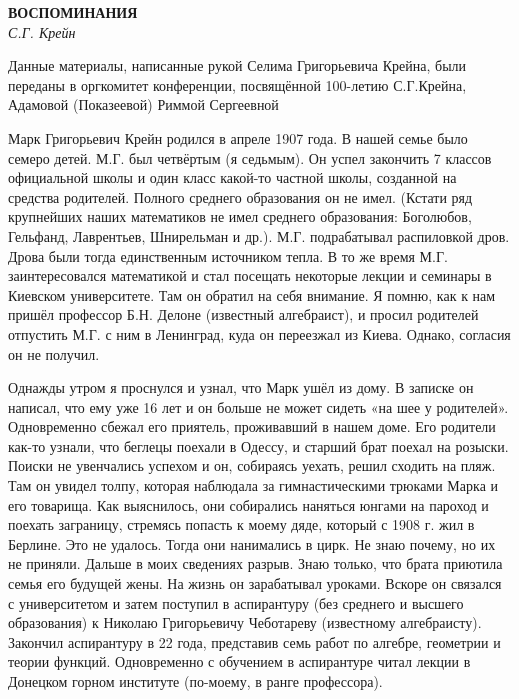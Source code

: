 \begin{center}{ \bf  ВОСПОМИНАНИЯ}\\
{\it С.Г. Крейн} \\
\end{center}
\begin{flushright}
Данные материалы,
написанные рукой Селима Григорьевича Крейна,
были переданы в оргкомитет конференции,
посвящённой 100-летию С.Г.Крейна,
 Адамовой (Показеевой) Риммой  Сергеевной
\end{flushright}

Марк Григорьевич Крейн родился в апреле 1907 года. В нашей семье было семеро детей. М.Г. был четвёртым (я седьмым). Он успел закончить 7 классов официальной школы и один класс какой-то частной школы, созданной на средства родителей. Полного среднего образования он не имел. (Кстати ряд крупнейших наших математиков не имел среднего образования: Боголюбов, Гельфанд, Лаврентьев, Шнирельман и др.). М.Г. подрабатывал распиловкой дров. Дрова были тогда единственным источником тепла. В то же время М.Г. заинтересовался математикой и стал посещать некоторые лекции и семинары в Киевском университете. Там он обратил на себя внимание. Я помню, как к нам пришёл профессор Б.Н. Делоне (известный алгебраист), и просил родителей отпустить М.Г. с ним в Ленинград, куда он переезжал из Киева. Однако, согласия он не получил.

Однажды утром я проснулся и узнал, что Марк ушёл из дому. В записке он написал, что ему уже 16 лет и он больше не может сидеть «на шее у родителей». Одновременно сбежал его приятель, проживавший в нашем доме. Его родители как-то узнали, что беглецы поехали в Одессу, и старший брат поехал на розыски. Поиски не увенчались успехом и он, собираясь уехать, решил сходить на пляж. Там он увидел толпу, которая наблюдала за гимнастическими трюками Марка и его товарища. Как выяснилось, они собирались наняться юнгами на пароход и поехать заграницу, стремясь попасть к моему дяде, который с 1908 г. жил в Берлине. Это не удалось. Тогда они нанимались в цирк. Не знаю почему, но их не приняли. Дальше в моих сведениях разрыв. Знаю только, что брата приютила семья его будущей жены. На жизнь он зарабатывал уроками. Вскоре он связался с университетом и затем поступил в аспирантуру (без среднего и высшего образования) к Николаю Григорьевичу Чеботареву (известному алгебраисту). Закончил аспирантуру в 22 года, представив семь работ по алгебре, геометрии и теории функций. Одновременно с обучением в аспирантуре читал лекции в Донецком горном институте (по-моему, в ранге профессора).

